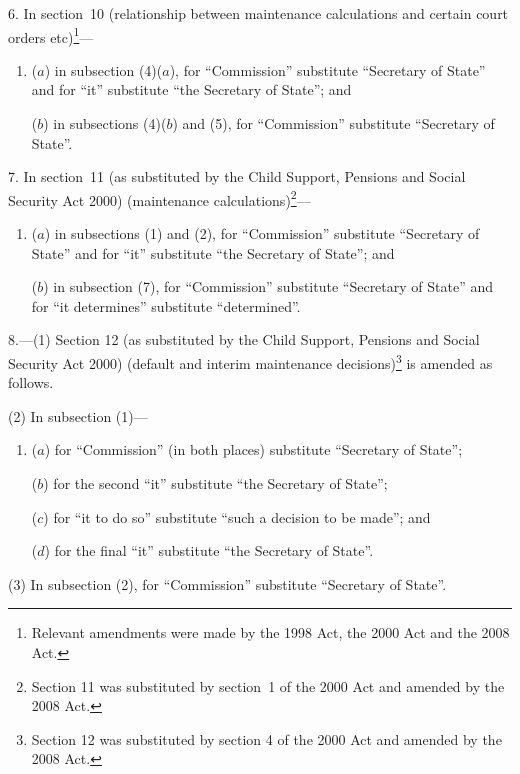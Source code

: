 \documentclass[12pt,a4paper]{article}
\begin{document}
\medskip

6.  In section~10 (relationship between maintenance calculations and certain court orders etc)\footnote{Relevant amendments were made by the 1998 Act, the 2000 Act and the 2008 Act.}—
\begin{enumerate}\item[]
($a$) in subsection (4)($a$), for “Commission” substitute “Secretary of State” and for “it” substitute “the Secretary of State”; and

($b$) in subsections (4)($b$)  and (5), for “Commission” substitute “Secretary of State”.
\end{enumerate}

\medskip

7.  In section~11 (as substituted by the Child Support, Pensions and Social Security Act 2000) (maintenance calculations)\footnote{Section 11 was substituted by section~1 of the 2000 Act and amended by the 2008 Act.}—
\begin{enumerate}\item[]
($a$) in subsections (1) and (2), for “Commission” substitute “Secretary of State” and for “it” substitute “the Secretary of State”; and

($b$) in subsection (7), for “Commission” substitute “Secretary of State” and for “it determines” substitute “determined”.
\end{enumerate}

\medskip

8.---(1)  Section 12 (as substituted by the Child Support, Pensions and Social Security Act 2000) (default and interim maintenance decisions)\footnote{Section 12 was substituted by section 4 of the 2000 Act and amended by the 2008 Act.} is amended as follows.

(2) In subsection (1)—
\begin{enumerate}\item[]
($a$) for “Commission” (in both places) substitute “Secretary of State”;

($b$) for the second “it” substitute “the Secretary of State”;

($c$) for “it to do so” substitute “such a decision to be made”; and

($d$) for the final “it” substitute “the Secretary of State”.
\end{enumerate}

(3) In subsection (2), for “Commission” substitute “Secretary of State”.

\medskip
\end{document}
